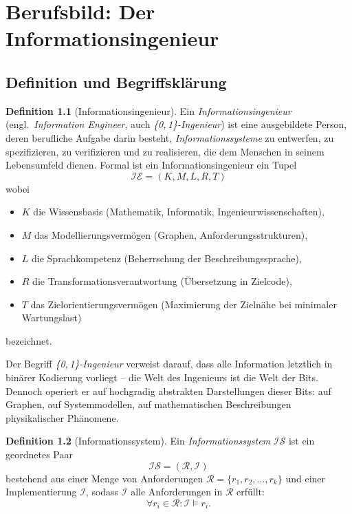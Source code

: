 ﻿\documentclass[a4paper,12pt]{report}
\theoremstyle{definition}
\newtheorem{definition}{Definition}[section]
\begin{document}

\chapter{Berufsbild: Der Informationsingenieur}
\label{sec:berufsbild}

\section{Definition und Begriffsklärung}

\begin{definition}[Informationsingenieur]
\label{def:infeng}
Ein \emph{Informationsingenieur} (engl.\ \emph{Information Engineer}, auch
\emph{\{0,\,1\}-Ingenieur}) ist eine ausgebildete Person, deren berufliche Aufgabe darin
besteht, \emph{Informationssysteme} zu entwerfen, zu spezifizieren, zu verifizieren und zu
realisieren, die dem Menschen in seinem Lebensumfeld dienen.
Formal ist ein Informationsingenieur ein Tupel
\[
  \mathcal{IE} = (K, M, L, R, T)
\]
wobei
\begin{itemize}
  \item $K$ die Wissensbasis (Mathematik, Informatik, Ingenieurwissenschaften),
  \item $M$ das Modellierungsvermögen (Graphen, Anforderungsstrukturen),
  \item $L$ die Sprachkompetenz (Beherrschung der Beschreibungssprache),
  \item $R$ die Transformationsverantwortung (Übersetzung in Zielcode),
  \item $T$ das Zielorientierungsvermögen (Maximierung der Zielnähe bei minimaler Wartungslast)
\end{itemize}
bezeichnet.
\end{definition}

Der Begriff \emph{\{0,\,1\}-Ingenieur} verweist darauf, dass alle Information letztlich in
binärer Kodierung vorliegt -- die Welt des Ingenieurs ist die Welt der Bits. Dennoch operiert
er auf hochgradig abstrakten Darstellungen dieser Bits: auf Graphen, auf Systemmodellen, auf
mathematischen Beschreibungen physikalischer Phänomene.

\begin{definition}[Informationssystem]
\label{def:infosys}
Ein \emph{Informationssystem} $\mathcal{IS}$ ist ein geordnetes Paar
\[
  \mathcal{IS} = (\mathcal{R}, \mathcal{I})
\]
bestehend aus einer Menge von Anforderungen $\mathcal{R} = \{r_1, r_2, \ldots, r_k\}$ und
einer Implementierung $\mathcal{I}$, sodass $\mathcal{I}$ alle Anforderungen in $\mathcal{R}$
erfüllt:
\[
  \forall r_i \in \mathcal{R}: \mathcal{I} \models r_i.
\]
\end{definition}
\end{document}
